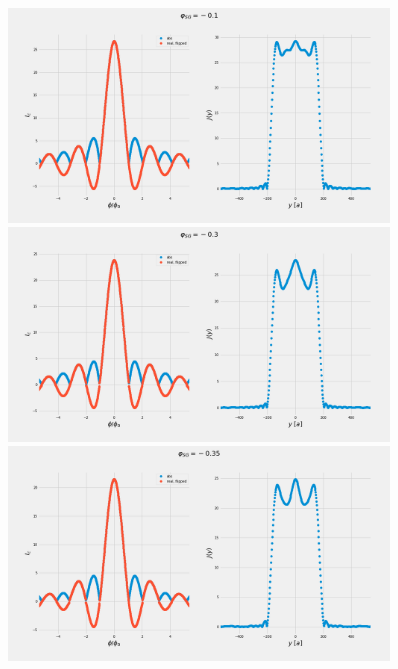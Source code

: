\documentclass[a4paper]{article}
\begin{document}
\begin{figure}
	\includegraphics[width=0.9\textwidth]{figs/wg32double/current_and_density_01}
	\includegraphics[width=0.9\textwidth]{figs/wg32double/current_and_density_03}
	\includegraphics[width=0.9\textwidth]{figs/wg32double/current_and_density_035}
\end{figure}
\end{document}
